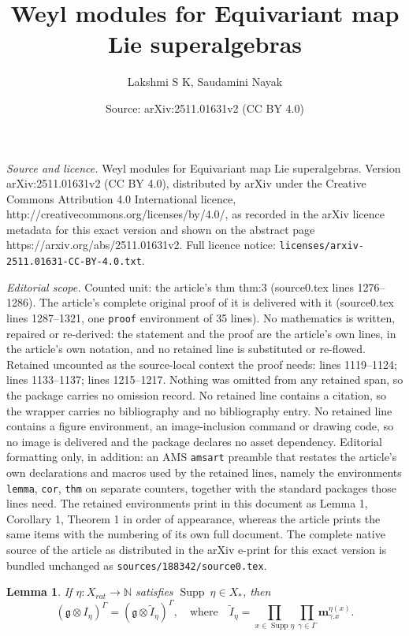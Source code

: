 \documentclass[10pt,a4paper]{amsart}
\title{Weyl modules for Equivariant map Lie superalgebras}
\author{Lakshmi S K, Saudamini Nayak}
\date{Source: arXiv:2511.01631v2 (CC BY 4.0)}
\newtheorem{lemma}{Lemma}
\DeclareMathOperator{\Supp}{Supp}
\newcommand{\g}{\mathfrak{g}}
\begin{document}
\maketitle

\noindent\emph{Source and licence.} Weyl modules for Equivariant map Lie superalgebras. Version arXiv:2511.01631v2 (CC BY 4.0), distributed by arXiv under the Creative Commons Attribution 4.0 International licence, http://creativecommons.org/licenses/by/4.0/, as recorded in the arXiv licence metadata for this exact version and shown on the abstract page https://arxiv.org/abs/2511.01631v2. Full licence notice: \texttt{licenses/arxiv-2511.01631-CC-BY-4.0.txt}.\par\smallskip

\noindent\textit{Editorial scope.} Counted unit: the article's thm thm:3 (source0.tex lines 1276--1286). The article's complete original proof of it is delivered with it (source0.tex lines 1287--1321, one \texttt{proof} environment of 35 lines). No mathematics is written, repaired or re-derived: the statement and the proof are the article's own lines, in the article's own notation, and no retained line is substituted or re-flowed.  Retained uncounted as the source-local context the proof needs: lines 1119--1124; lines 1133--1137; lines 1215--1217.  Nothing was omitted from any retained span, so the package carries no omission record.  No retained line contains a citation, so the wrapper carries no bibliography and no bibliography entry.  No retained line contains a figure environment, an image-inclusion command or drawing code, so no image is delivered and the package declares no asset dependency.  Editorial formatting only, in addition: an AMS \texttt{amsart} preamble that restates the article's own declarations and macros used by the retained lines, namely the environments \texttt{lemma}, \texttt{cor}, \texttt{thm} on separate counters, together with the standard packages those lines need.  The retained environments print in this document as Lemma 1, Corollary 1, Theorem 1 in order of appearance, whereas the article prints the same items with the numbering of its own full document.  The complete native source of the article as distributed in the arXiv e-print for this exact version is bundled unchanged as \texttt{sources/188342/source0.tex}.
\begin{lemma}\label{lem:10}
    If $\eta:X_{rat}\rightarrow\mathbb{N}$ satisfies $\Supp~\eta\in X_{*}$, then
    \begin{equation*}
        (\g\otimes I_{\eta})^{\Gamma}=(\g\otimes \tilde I_{\eta})^{\Gamma}, \quad \mbox{where}\quad \tilde I_{\eta}=\prod_{x\in \Supp\eta}\prod_{\gamma\in\Gamma}\textbf{m}_{\gamma.x}^{\eta(x)}.
    \end{equation*}
\end{lemma}
\end{document}

